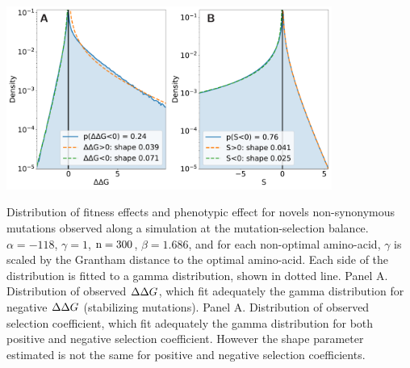 \documentclass{article}
\begin{document}
\begin{center}
	\includegraphics[width=0.8\textwidth] {artworks/DPE-DFE.pdf}
\end{center}

Distribution of fitness effects and phenotypic effect for novels non-synonymous mutations observed along a simulation at the mutation-selection balance. $\alpha=-118$, $\gamma=1$, $\text{n}=300$, $\beta=1.686$, and for each non-optimal amino-acid, $\gamma$ is scaled by the Grantham distance to the optimal amino-acid.
Each side of the distribution is fitted to a gamma distribution, shown in dotted line. 
Panel A. Distribution of observed $\Delta \Delta G$, which fit adequately the gamma distribution for negative $\Delta \Delta G$ (stabilizing mutations). 
Panel A. Distribution of observed selection coefficient, which fit adequately the gamma distribution for both positive and negative selection coefficient. However the shape parameter estimated is not the same for positive and negative selection coefficients. 




\end{document}
